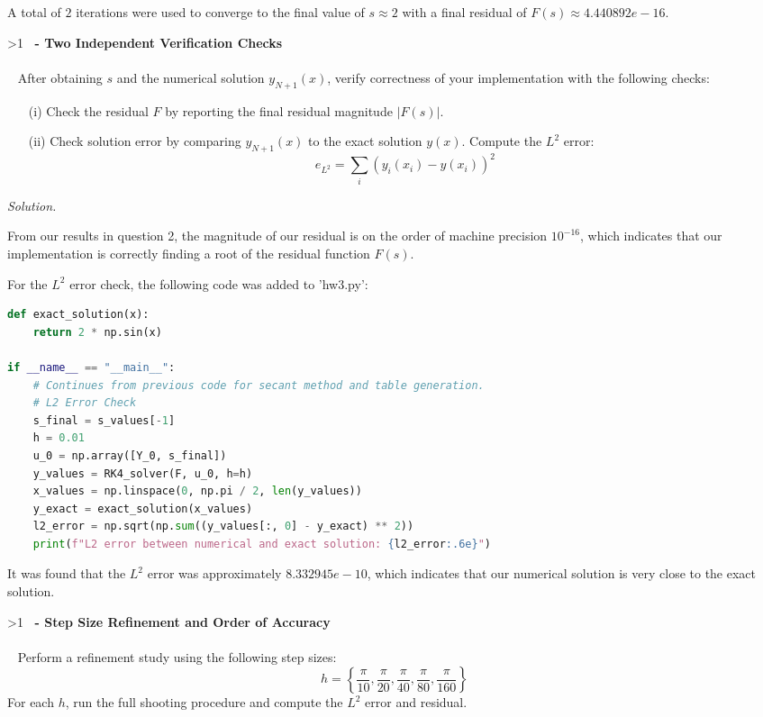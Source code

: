 \documentclass[12pt]{article}
\newcounter{question}
\newcounter{subquest}
\newcommand{\question}[1]{
    \stepcounter{question} 
    \ifnum\value{question}>1 \fi
    \vspace{.5em}
    \textbf{ \Large\thequestion \ - #1} \\
    \vspace{.5em} 
    \hrulefill \\
    \setcounter{subquest}{0}\ }
\newcommand{\solution}
    {\hrulefill \par\vspace{0.5em}\noindent\emph{Solution.}\ }
    {\par\vspace{1em}}
\begin{document}
A total of $2$ iterations were used to converge to the final value of $s \approx 2$ with a final residual of $F(s) \approx 4.440892e-16$.

\hrulefill

\question{Two Independent Verification Checks}
After obtaining $s$ and the numerical solution $y_{N+1}(x)$, verify correctness of your implementation with the following checks:
\begin{itemize}
    \item[(i)] Check the residual $F$ by reporting the final residual magnitude $|F(s)|$.
    \item[(ii)] Check solution error by comparing $y_{N+1}(x)$ to the exact solution $y(x)$. Compute the $L^2$ error:
    \[ e_{L^2} = \sum_i (y_i(x_i) - y(x_i))^2 \]
\end{itemize}

\solution

From our results in question 2, the magnitude of our residual is on the order of machine precision $10^{-16}$, which indicates that our implementation is correctly finding a root of the residual function $F(s)$.

For the $L^2$ error check, the following code was added to 'hw3.py':
\begin{lstlisting}[language=Python, caption={L2 Error Implementation (hw3.py)}]
def exact_solution(x):
    return 2 * np.sin(x)

if __name__ == "__main__":
    # Continues from previous code for secant method and table generation.
    # L2 Error Check
    s_final = s_values[-1]
    h = 0.01
    u_0 = np.array([Y_0, s_final])
    y_values = RK4_solver(F, u_0, h=h)
    x_values = np.linspace(0, np.pi / 2, len(y_values))
    y_exact = exact_solution(x_values)
    l2_error = np.sqrt(np.sum((y_values[:, 0] - y_exact) ** 2))
    print(f"L2 error between numerical and exact solution: {l2_error:.6e}")
\end{lstlisting}

It was found that the $L^2$ error was approximately $8.332945e-10$, which indicates that our numerical solution is very close to the exact solution.

\hrulefill

\question{Step Size Refinement and Order of Accuracy}
Perform a refinement study using the following step sizes:
\[h=\left\{\frac{\pi}{10}, \frac{\pi}{20}, \frac{\pi}{40}, \frac{\pi}{80}, \frac{\pi}{160}\right\}\]
For each $h$, run the full shooting procedure and compute the $L^2$ error and residual. 
\end{document}
